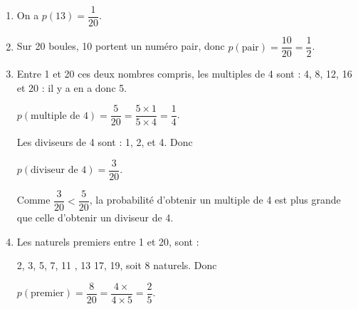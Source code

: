 
\medskip

\begin{enumerate}
\item On a $p(13) = \dfrac{1}{20}$.
\item Sur 20 boules, 10 portent un numéro pair, donc $p(\text{pair}) = \dfrac{10}{20} = \dfrac{1}{2}$.
\item Entre 1 et 20 ces deux nombres compris, les multiples de 4 sont : 4, 8, 12, 16 et 20 : il y a en a donc 5.

$p(\text{multiple de } 4) = \dfrac{5}{20} = \dfrac{5\times 1}{5\times 4} = \dfrac{1}{4}$.

Les diviseurs de 4 sont : 1, 2, et 4. Donc 

$p(\text{diviseur de } 4) = \dfrac{3}{20}$.

Comme $\dfrac{3}{20} < \dfrac{5}{20}$, la probabilité d'obtenir un multiple de 4 est plus grande que celle d'obtenir un diviseur de 4.
\item Les naturels premiers entre 1 et 20, sont :

2, 3, 5, 7, 11 , 13 17, 19, soit 8 naturels. Donc 

$p(\text{premier}) = \dfrac{8}{20} = \dfrac{4\times}{4 \times 5} = \dfrac{2}{5}$.
\end{enumerate}

\vspace{0,5cm}

